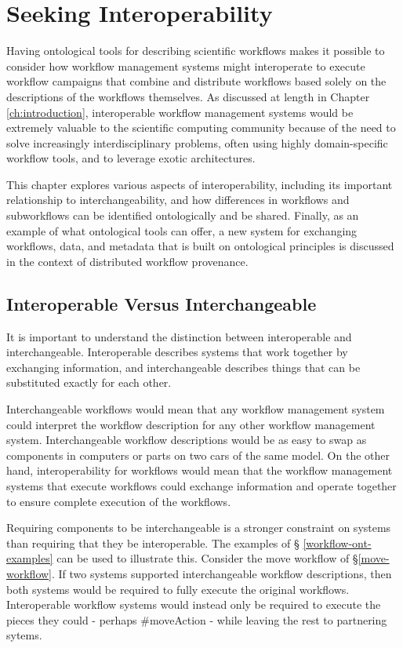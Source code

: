\chapter{Seeking Interoperability} \label{ch:interoperability}

Having ontological tools for describing scientific workflows makes it possible
to consider how workflow management systems might interoperate to execute
workflow campaigns that combine and distribute workflows based solely on the
descriptions of the workflows themselves. As discussed at length in
Chapter \ref{ch:introduction}, interoperable workflow management systems would
be extremely valuable to the scientific computing community because of the need
to solve increasingly interdisciplinary problems, often using highly
domain-specific workflow tools, and to leverage exotic architectures.

This chapter explores various aspects of interoperability, including its
important relationship to interchangeability, and how differences in workflows
and subworkflows can be identified ontologically and be shared. Finally, as an
example of what ontological tools can offer, a new system for exchanging
workflows, data, and metadata that is built on ontological principles is
discussed in the context of distributed workflow provenance.

\section{Interoperable Versus Interchangeable}

It is important to understand the distinction between interoperable and
interchangeable. Interoperable describes systems that work together by
exchanging information, and interchangeable describes things that can be
substituted exactly for each other.

Interchangeable workflows would mean that any workflow management system could
interpret the workflow description for any other workflow management system.
Interchangeable workflow descriptions would be as easy to swap as components in
computers or parts on two cars of the same model. On the other hand,
interoperability for workflows would mean that the workflow management systems
that execute workflows could exchange information and operate together to
ensure complete execution of the workflows.

Requiring components to be interchangeable is a stronger constraint on systems
than requiring that they be interoperable. The examples of \S
\ref{workflow-ont-examples} can be used to illustrate this. Consider the move
workflow of \S \ref{move-workflow}. If two systems supported interchangeable
workflow descriptions, then both systems would be required to fully execute the
original workflows. Interoperable workflow systems would instead only be
required to execute the pieces they could - perhaps \#moveAction - while leaving
the rest to partnering sytems.

